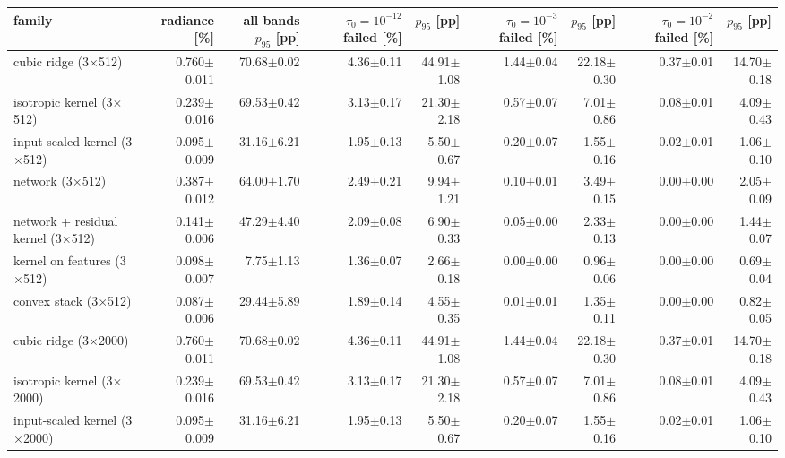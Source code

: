 \begin{tabular}{lrrrrrrrr}
\toprule
family & radiance [\%] & \thead{all bands\\$p_{95}$ [pp]} & \thead{$\tau_0=10^{-12}$\\failed [\%]} & $p_{95}$ [pp] & \thead{$\tau_0=10^{-3}$\\failed [\%]} & $p_{95}$ [pp] & \thead{$\tau_0=10^{-2}$\\failed [\%]} & $p_{95}$ [pp] \\
\midrule
cubic ridge (3$\times$512) & 0.760$\pm$0.011 & 70.68$\pm$0.02 & 4.36$\pm$0.11 & 44.91$\pm$1.08 & 1.44$\pm$0.04 & 22.18$\pm$0.30 & 0.37$\pm$0.01 & 14.70$\pm$0.18 \\
isotropic kernel (3$\times$512) & 0.239$\pm$0.016 & 69.53$\pm$0.42 & 3.13$\pm$0.17 & 21.30$\pm$2.18 & 0.57$\pm$0.07 & 7.01$\pm$0.86 & 0.08$\pm$0.01 & 4.09$\pm$0.43 \\
input-scaled kernel (3$\times$512) & 0.095$\pm$0.009 & 31.16$\pm$6.21 & 1.95$\pm$0.13 & 5.50$\pm$0.67 & 0.20$\pm$0.07 & 1.55$\pm$0.16 & 0.02$\pm$0.01 & 1.06$\pm$0.10 \\
network (3$\times$512) & 0.387$\pm$0.012 & 64.00$\pm$1.70 & 2.49$\pm$0.21 & 9.94$\pm$1.21 & 0.10$\pm$0.01 & 3.49$\pm$0.15 & 0.00$\pm$0.00 & 2.05$\pm$0.09 \\
network + residual kernel (3$\times$512) & 0.141$\pm$0.006 & 47.29$\pm$4.40 & 2.09$\pm$0.08 & 6.90$\pm$0.33 & 0.05$\pm$0.00 & 2.33$\pm$0.13 & 0.00$\pm$0.00 & 1.44$\pm$0.07 \\
kernel on features (3$\times$512) & 0.098$\pm$0.007 & 7.75$\pm$1.13 & 1.36$\pm$0.07 & 2.66$\pm$0.18 & 0.00$\pm$0.00 & 0.96$\pm$0.06 & 0.00$\pm$0.00 & 0.69$\pm$0.04 \\
convex stack (3$\times$512) & 0.087$\pm$0.006 & 29.44$\pm$5.89 & 1.89$\pm$0.14 & 4.55$\pm$0.35 & 0.01$\pm$0.01 & 1.35$\pm$0.11 & 0.00$\pm$0.00 & 0.82$\pm$0.05 \\
cubic ridge (3$\times$2000) & 0.760$\pm$0.011 & 70.68$\pm$0.02 & 4.36$\pm$0.11 & 44.91$\pm$1.08 & 1.44$\pm$0.04 & 22.18$\pm$0.30 & 0.37$\pm$0.01 & 14.70$\pm$0.18 \\
isotropic kernel (3$\times$2000) & 0.239$\pm$0.016 & 69.53$\pm$0.42 & 3.13$\pm$0.17 & 21.30$\pm$2.18 & 0.57$\pm$0.07 & 7.01$\pm$0.86 & 0.08$\pm$0.01 & 4.09$\pm$0.43 \\
input-scaled kernel (3$\times$2000) & 0.095$\pm$0.009 & 31.16$\pm$6.21 & 1.95$\pm$0.13 & 5.50$\pm$0.67 & 0.20$\pm$0.07 & 1.55$\pm$0.16 & 0.02$\pm$0.01 & 1.06$\pm$0.10 \\

\end{tabular}
